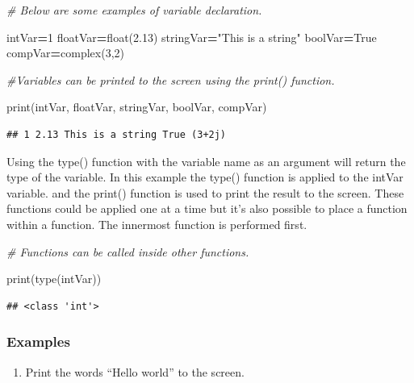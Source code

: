 \documentclass[
]{book}
\newenvironment{Shaded}{\begin{snugshade}}{\end{snugshade}}
\newcommand{\BuiltInTok}[1]{#1}
\newcommand{\CommentTok}[1]{\textcolor[rgb]{0.56,0.35,0.01}{\textit{#1}}}
\newcommand{\DecValTok}[1]{\textcolor[rgb]{0.00,0.00,0.81}{#1}}
\newcommand{\FloatTok}[1]{\textcolor[rgb]{0.00,0.00,0.81}{#1}}
\newcommand{\NormalTok}[1]{#1}
\newcommand{\OperatorTok}[1]{\textcolor[rgb]{0.81,0.36,0.00}{\textbf{#1}}}
\newcommand{\StringTok}[1]{\textcolor[rgb]{0.31,0.60,0.02}{#1}}
\newcommand{\VariableTok}[1]{\textcolor[rgb]{0.00,0.00,0.00}{#1}}
\providecommand{\tightlist}{%
  \setlength{\itemsep}{0pt}\setlength{\parskip}{0pt}}
\begin{document}
\begin{Shaded}
\begin{Highlighting}[]
\CommentTok{\# Below are some examples of variable declaration.}

\NormalTok{intVar}\OperatorTok{=}\DecValTok{1}
\NormalTok{floatVar}\OperatorTok{=}\BuiltInTok{float}\NormalTok{(}\FloatTok{2.13}\NormalTok{)}
\NormalTok{stringVar}\OperatorTok{=}\StringTok{"This is a string"}
\NormalTok{boolVar}\OperatorTok{=}\VariableTok{True}
\NormalTok{compVar}\OperatorTok{=}\BuiltInTok{complex}\NormalTok{(}\DecValTok{3}\NormalTok{,}\DecValTok{2}\NormalTok{)}

\CommentTok{\#Variables can be printed to the screen using the print() function. }

\BuiltInTok{print}\NormalTok{(intVar, floatVar, stringVar, boolVar, compVar)}
\end{Highlighting}
\end{Shaded}

\begin{verbatim}
## 1 2.13 This is a string True (3+2j)
\end{verbatim}

Using the type() function with the variable name as an argument will return the type of the variable. In this example the type() function is applied to the intVar variable. and the print() function is used to print the result to the screen. These functions could be applied one at a time but it's also possible to place a function within a function. The innermost function is performed first.

\begin{Shaded}
\begin{Highlighting}[]
\CommentTok{\# Functions can be called inside other functions.}

\BuiltInTok{print}\NormalTok{(}\BuiltInTok{type}\NormalTok{(intVar))}
\end{Highlighting}
\end{Shaded}

\begin{verbatim}
## <class 'int'>
\end{verbatim}

\hypertarget{examples}{%
\subsubsection{Examples}\label{examples}}

\begin{enumerate}
\def\labelenumi{\arabic{enumi}.}
\tightlist
\item
  Print the words ``Hello world'' to the screen.
\end{enumerate}
\end{document}
